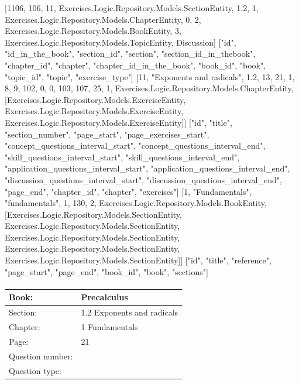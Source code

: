 \documentclass{article}
\begin{document}
    [1106, 106, 11, Exercises.Logic.Repository.Models.SectionEntity, 1.2, 1, Exercises.Logic.Repository.Models.ChapterEntity, 0, 2, Exercises.Logic.Repository.Models.BookEntity, 3, Exercises.Logic.Repository.Models.TopicEntity, Discussion]
    ["id", "id_in_the_book", "section_id", "section", "section_id_in_thebook", "chapter_id", "chapter", "chapter_id_in_the_book", "book_id", "book", "topic_id", "topic", "exercise_type"]
    [11, "Exponents and radicals", 1.2, 13, 21, 1, 8, 9, 102, 0, 0, 103, 107, 25, 1, Exercises.Logic.Repository.Models.ChapterEntity, [Exercises.Logic.Repository.Models.ExerciseEntity, Exercises.Logic.Repository.Models.ExerciseEntity, Exercises.Logic.Repository.Models.ExerciseEntity]]
    ["id", "title", "section_number", "page_start", "page_exercises_start", "concept_questions_interval_start", "concept_questions_interval_end", "skill_questions_interval_start", "skill_questions_interval_end", "application_questions_interval_start", "application_questions_interval_end", "discussion_questions_interval_start", "discussion_questions_interval_end", "page_end", "chapter_id", "chapter", "exercises"]
    [1, "Fundamentals", "fundamentals", 1, 130, 2, Exercises.Logic.Repository.Models.BookEntity, [Exercises.Logic.Repository.Models.SectionEntity, Exercises.Logic.Repository.Models.SectionEntity, Exercises.Logic.Repository.Models.SectionEntity, Exercises.Logic.Repository.Models.SectionEntity, Exercises.Logic.Repository.Models.SectionEntity]]
    ["id", "title", "reference", "page_start", "page_end", "book_id", "book", "sections"]

   \paragraph{}
   \begin{tabularx}{1\textwidth}{
           p{}
           p{}
       }
       \toprule
       Book: & Precalculus
       \\
       \midrule
       Section: & 1.2 Exponents and radicals
       \\
       \midrule
       Chapter: & 1 Fundamentals
       \\
       \midrule
       Page: & 21
       \\
       \midrule
       Question number: & 
       \\
       \midrule
       Question type: & 
       \\
       \bottomrule
   \end{tabularx}
\end{document}
